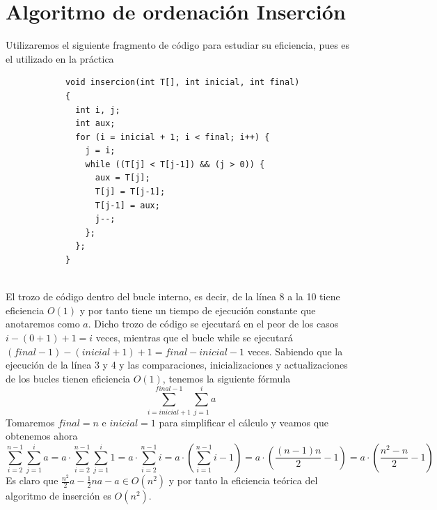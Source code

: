 \documentclass[11pt,openany]{book}
\begin{document}
\section*{Algoritmo de ordenación Inserción}
Utilizaremos el siguiente fragmento de código para estudiar su eficiencia, pues es el utilizado en la práctica
\begin{lstlisting}
            void insercion(int T[], int inicial, int final)
            {
              int i, j;
              int aux;
              for (i = inicial + 1; i < final; i++) {
                j = i;
                while ((T[j] < T[j-1]) && (j > 0)) {
                  aux = T[j];
                  T[j] = T[j-1];
                  T[j-1] = aux;
                  j--;
                };
              };
            }
            
        \end{lstlisting}
El trozo de código dentro del bucle interno, es decir, de la línea 8 a la 10 tiene eficiencia $O(1)$ y por tanto
tiene un tiempo de ejecución constante que anotaremos como $a$. Dicho trozo de código se ejecutará en el peor de los casos
$i-(0+1)+1=i$ veces, mientras que el bucle while se ejecutará $(final-1)-(inicial+1)+1=final-inicial-1$ veces.
Sabiendo que la ejecución de la línea 3 y 4 y las comparaciones, inicializaciones y actualizaciones de los bucles tienen eficiencia $O(1)$,
tenemos la siguiente fórmula
\begin{equation*}
    \sum_{i=inicial+1}^{final-1} \sum_{j=1}^{i}a
\end{equation*}
Tomaremos $final =  n$ e $inicial = 1$ para simplificar el cálculo y veamos que obtenemos ahora
\begin{equation*}
    \sum_{i=2}^{n-1} \sum_{j=1}^{i}a= a \cdot \sum_{i=2}^{n-1} \sum_{j=1}^{i}1= a \cdot \sum_{i=2}^{n-1} i= a \cdot \left(\sum_{i=1}^{n-1}i - 1\right)= 
    a \cdot \left(\frac{(n-1)n}{2}-1\right)= a\cdot \left(\frac{n^2-n}{2}-1\right)
\end{equation*}
Es claro que $\frac{n^2}{2}a-\frac{1}{2}na-a \in O(n^2)$ y por tanto la eficiencia teórica del algoritmo de inserción es $O(n^2)$.
\end{document}
